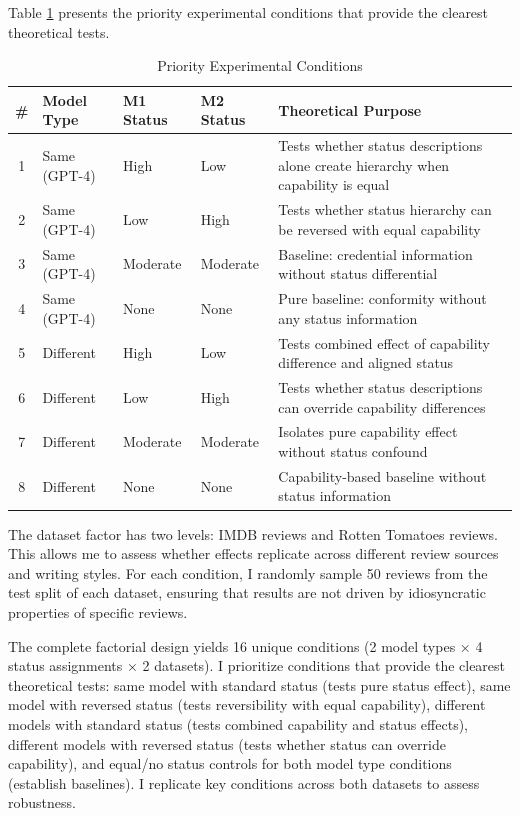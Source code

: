 Table \ref{tab:priority_conditions} presents the priority experimental conditions that provide the clearest theoretical tests.

\begin{table}[htbp]
\centering
\caption{Priority Experimental Conditions}
\label{tab:priority_conditions}
\begin{tabular}{clllp{6cm}}
\hline
\textbf{\#} & \textbf{Model Type} & \textbf{M1 Status} & \textbf{M2 Status} & \textbf{Theoretical Purpose} \\
\hline
1 & Same (GPT-4) & High & Low & Tests whether status descriptions alone create hierarchy when capability is equal \\
2 & Same (GPT-4) & Low & High & Tests whether status hierarchy can be reversed with equal capability \\
3 & Same (GPT-4) & Moderate & Moderate & Baseline: credential information without status differential \\
4 & Same (GPT-4) & None & None & Pure baseline: conformity without any status information \\
5 & Different & High & Low & Tests combined effect of capability difference and aligned status \\
6 & Different & Low & High & Tests whether status descriptions can override capability differences \\
7 & Different & Moderate & Moderate & Isolates pure capability effect without status confound \\
8 & Different & None & None & Capability-based baseline without status information \\
\hline
\end{tabular}
\end{table}

The dataset factor has two levels: IMDB reviews and Rotten Tomatoes reviews. This allows me to assess whether effects replicate across different review sources and writing styles. For each condition, I randomly sample 50 reviews from the test split of each dataset, ensuring that results are not driven by idiosyncratic properties of specific reviews.

The complete factorial design yields 16 unique conditions (2 model types × 4 status assignments × 2 datasets). I prioritize conditions that provide the clearest theoretical tests: same model with standard status (tests pure status effect), same model with reversed status (tests reversibility with equal capability), different models with standard status (tests combined capability and status effects), different models with reversed status (tests whether status can override capability), and equal/no status controls for both model type conditions (establish baselines). I replicate key conditions across both datasets to assess robustness.

